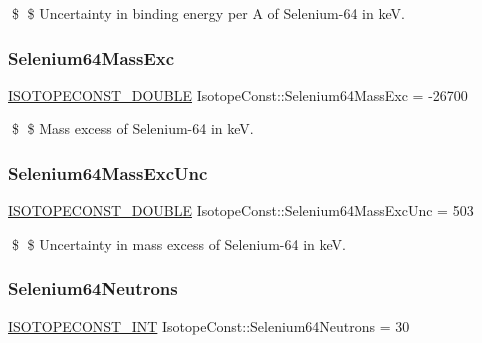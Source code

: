 \$ \$ Uncertainty in binding energy per A of Selenium-\/64 in keV. \mbox{\label{group___isotope_const-_selenium-_se64_gad31037ecbf26974fa366d0d923795f29}} 
\subsubsection{\texorpdfstring{Selenium64\+Mass\+Exc}{Selenium64MassExc}}
{\footnotesize\ttfamily \mbox{\hyperlink{group___isotope_const-_macros_ga8f45a7272ce02c0b4c65c44636ed719a}{I\+S\+O\+T\+O\+P\+E\+C\+O\+N\+S\+T\+\_\+\+D\+O\+U\+B\+LE}} Isotope\+Const\+::\+Selenium64\+Mass\+Exc = -\/26700}

\$ \$ Mass excess of Selenium-\/64 in keV. \mbox{\label{group___isotope_const-_selenium-_se64_ga88df6112cb352022e17eab0c3fd9a869}} 
\subsubsection{\texorpdfstring{Selenium64\+Mass\+Exc\+Unc}{Selenium64MassExcUnc}}
{\footnotesize\ttfamily \mbox{\hyperlink{group___isotope_const-_macros_ga8f45a7272ce02c0b4c65c44636ed719a}{I\+S\+O\+T\+O\+P\+E\+C\+O\+N\+S\+T\+\_\+\+D\+O\+U\+B\+LE}} Isotope\+Const\+::\+Selenium64\+Mass\+Exc\+Unc = 503}

\$ \$ Uncertainty in mass excess of Selenium-\/64 in keV. \mbox{\label{group___isotope_const-_selenium-_se64_ga39947b122c9819b08ae02da890cb6043}} 
\subsubsection{\texorpdfstring{Selenium64\+Neutrons}{Selenium64Neutrons}}
{\footnotesize\ttfamily \mbox{\hyperlink{group___isotope_const-_macros_ga5f18360b3e99483a35c32d789e62621c}{I\+S\+O\+T\+O\+P\+E\+C\+O\+N\+S\+T\+\_\+\+I\+NT}} Isotope\+Const\+::\+Selenium64\+Neutrons = 30}


